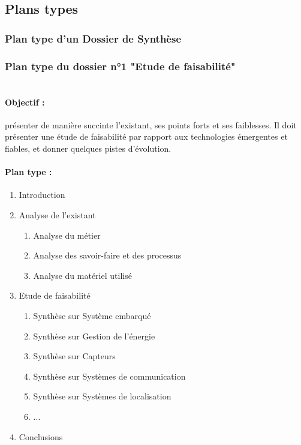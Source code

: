   \subsection{Plans types}     
    \subsubsection{Plan type d'un Dossier de Synthèse}
    
    \subsubsection{Plan type du dossier n°1 "Etude de faisabilité"}
      \paragraph*{\\Objectif :}
        présenter de manière succinte l'existant, ses points forts et ses faiblesses. Il doit
        présenter une étude de faisabilité par rapport aux technologies émergentes et fiables, et donner quelques pistes d'évolution.
      \paragraph*{Plan type :\\}
        \begin{enumerate}
          \item Introduction
          \item Analyse de l'existant
            \begin{enumerate}
              \item Analyse du métier
              \item Analyse des savoir-faire et des processus
              \item Analyse du matériel utilisé
            \end{enumerate}
          \item Etude de faisabilité
            \begin{enumerate}
              \item Synthèse sur Système embarqué
              \item Synthèse sur Gestion de l'énergie
              \item Synthèse sur Capteurs
              \item Synthèse sur Systèmes de communication
              \item Synthèse sur Systèmes de localisation
              \item ...
            \end{enumerate} 
          \item Conclusions 
        \end{enumerate}
        
